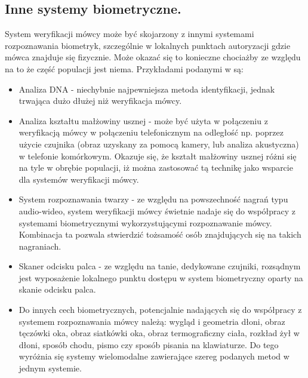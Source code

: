 \subsection{Inne systemy biometryczne.}
System weryfikacji mówcy może być skojarzony z innymi systemami rozpoznawania biometryk, szczególnie w lokalnych punktach autoryzacji gdzie mówca znajduje się fizycznie. Może okazać się to konieczne chociażby ze względu na to że część populacji jest niema. Przykładami podanymi w \cite{fosr} są:
\begin{itemize}
  \item Analiza DNA - niechybnie najpewniejsza metoda identyfikacji, jednak trwająca dużo dłużej niż weryfikacja mówcy. 
  \item Analiza kształtu małżowiny usznej - może być użyta w połączeniu z weryfikacją mówcy w połączeniu telefonicznym na odległość np. poprzez użycie czujnika (obraz uzyskany za pomocą kamery, lub analiza akustyczna) w telefonie komórkowym. Okazuje się, że kształt małżowiny usznej różni się na tyle w obrębie populacji, iż można zastosować tą technikę jako wsparcie dla systemów weryfikacji mówcy. 
  \item System rozpoznawania twarzy - ze względu na powszechność nagrań typu audio-wideo, system weryfikacji mówcy świetnie nadaje się do współpracy z systemami biometrycznymi wykorzystującymi rozpoznawanie mówcy. Kombinacja ta pozwala stwierdzić tożsamość osób znajdujących się na takich nagraniach. 
  \item Skaner odcisku palca - ze względu na tanie, dedykowane czujniki, rozsądnym jest wyposażenie lokalnego punktu dostępu w system biometryczny oparty na skanie odcisku palca.
  \item Do innych cech biometrycznych, potencjalnie nadających się do współpracy z systemem rozpoznawania mówcy należą: wygląd i geometria dłoni, obraz tęczówki oka, obraz siatkówki oka, obraz termograficzny ciała, rozkład żył w dłoni, sposób chodu, pismo czy sposób pisania na klawiaturze. Do tego wyróżnia się systemy wielomodalne zawierające szereg podanych metod w jednym systemie.
  
\end{itemize}

